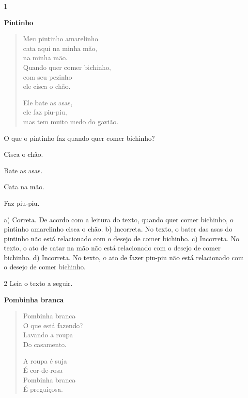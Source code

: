 
\num{1}

\textbf{Pintinho}

\begin{verse}
Meu pintinho amarelinho\\
cata aqui na minha mão,\\ 
na minha mão.\\
Quando quer comer bichinho,\\ 
com seu pezinho\\ 
ele cisca o chão.

Ele bate as asas,\\
ele faz piu-piu,\\ 
mas tem muito medo do gavião.
\end{verse}


O que o pintinho faz quando quer comer bichinho?

\begin{minipage}{.5\textwidth}
\begin{escolha}
	\item Cisca o chão.

	\item Bate as asas.

	\item Cata na mão.

	\item Faz piu-piu.
\end{escolha}
\end{minipage}

a) Correta. De acordo com a leitura do texto, quando quer comer
bichinho, o pintinho amarelinho cisca o chão.
b) Incorreta. No texto, o bater das asas do pintinho não está 
relacionado com o desejo de comer bichinho.
c) Incorreta. No texto, o ato de catar na mão não está 
relacionado com o desejo de comer bichinho.
d) Incorreta. No texto, o ato de fazer piu-piu não está 
relacionado com o desejo de comer bichinho.

\num{2} Leia o texto a seguir.

\textbf{Pombinha branca}

\begin{verse}
Pombinha branca \\
O que está fazendo?\\
Lavando a roupa\\
Do casamento.

A roupa é suja\\
É cor-de-rosa\\
Pombinha branca\\
É preguiçosa.

\end{verse}

